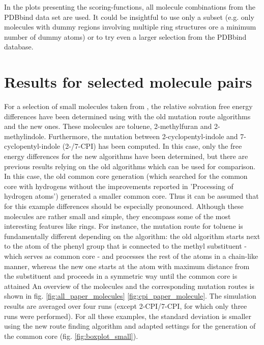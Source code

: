 In the plots presenting the scoring-functions, all molecule combinations
from the PDBbind data set are used. It could be insightful to use
only a subset (e.g. only molecules with dummy regions involving multiple
ring structures ore a minimum number of dummy atoms) or to try even a larger selection from the PDBbind database.

\section{Results for selected molecule pairs}

For a selection of small molecules taken from \cite{Loeffler.2018, Wieder.2022}, the relative solvation free energy differences have been determined using {\trafo} with the old mutation route algorithms and the new ones. These molecules are toluene, 2-methylfuran and 2-methylindole.
Furthermore, the mutation between 2-cyclopentyl-indole and 7-cyclopentyl-indole (2-/7-CPI) has been computed. In this case, only the free energy differences for the new algorithms have been determined, but there are previous results relying on the old algorithms which can be used for comparison. In this case, the old common core generation (which searched for the common core with hydrogens without the improvements reported in 'Processing of hydrogen atoms') generated a smaller common core. Thus it can be assumed that for this example differences should be especially pronounced.
Although these molecules are rather small and simple, they encompass some of the most interesting features like rings. For instance, the mutation route for toluene is fundamentally different depending on the algorithm: the old algorithm starts next to the atom of the phenyl group that is connected to the methyl substituent - which serves as common core - and processes the rest of the atoms in a chain-like manner, whereas the new one starts at the atom with maximum distance from the substituent and proceeds in a symmetric way until the common core is attained
An overview of the molecules and the corresponding mutation routes is shown in fig. \ref{fig:all_paper_molecules}  \ref{fig:cpi_paper_molecule}.
The simulation results are averaged over four runs (except 2-CPI/7-CPI, for which only three runs were performed). 
For all these examples, the standard deviation is smaller using the new route finding algorithm and adapted settings for the generation of the common core (fig. \ref{fig:boxplot_small}).


